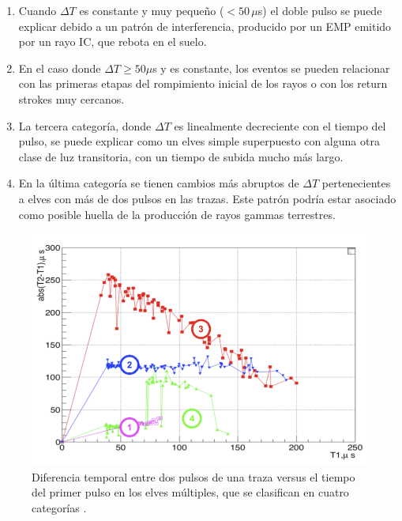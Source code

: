 \documentclass[12pt,oneside,openany,letter]{book}
\begin{document}
\begin{enumerate}
    \item Cuando $\Delta T$ es constante y muy pequeño ($<50 \,\mu$s) el doble pulso se puede explicar debido a un patrón de interferencia, producido por un EMP emitido por un rayo IC, que rebota en el suelo. 
    \item En el caso donde $\Delta T \geq 50\mu$s y es constante, los eventos se pueden relacionar con las primeras etapas del rompimiento inicial de los rayos o con los return strokes muy cercanos. 
    \item La tercera categor\'ia, donde $\Delta T$ es linealmente decreciente con el tiempo del pulso, se puede explicar como un elves simple superpuesto con alguna otra clase de luz transitoria, con un tiempo de subida mucho más largo.
    \item En la \'ultima categor\'ia se tienen cambios m\'as abruptos de $\Delta T$ pertenecientes a elves con m\'as de dos pulsos en las trazas. Este patr\'on podr\'ia estar asociado como posible huella de la producci\'on de rayos gammas terrestres.
    \end{enumerate}

\begin{figure}
    \centering
    \includegraphics[scale=1]{figures/categorias.png}
    \caption[Diferencia temporal entre dos pulsos de una traza versus el tiempo del primer pulso en los elves m\'ultiples]{Diferencia temporal entre dos pulsos de una traza versus el tiempo del primer pulso en los elves m\'ultiples, que se clasifican en cuatro categor\'ias \cite{Mussa2019}. }
    \label{fig:categorias}
\end{figure}





\end{document}
